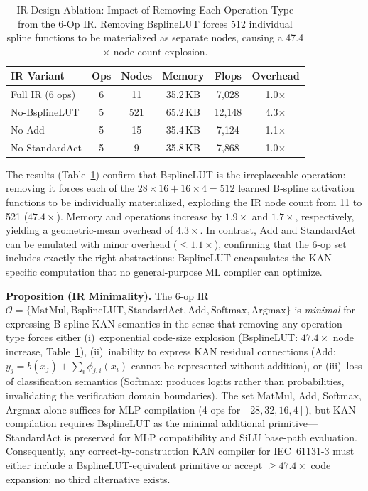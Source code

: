 \documentclass[journal,onecolumn]{IEEEtran}
\begin{document}
\begin{table}[t]
\centering
\caption{IR Design Ablation: Impact of Removing Each Operation Type from the 6-Op IR. Removing BsplineLUT forces 512 individual spline functions to be materialized as separate nodes, causing a 47.4$\times$ node-count explosion.}
\label{tab:ir_ablation}
\small
\footnotesize
\begin{tabular}{lccccc}
\toprule
\textbf{IR Variant} & \textbf{Ops} & \textbf{Nodes} &
  \textbf{Memory} & \textbf{Flops} & \textbf{Overhead} \\
\midrule
Full IR (6 ops)      & 6 & 11   & 35.2\,KB & 7{,}028  & 1.0$\times$ \\
No-BsplineLUT        & 5 & 521  & 65.2\,KB & 12{,}148 & 4.3$\times$ \\
No-Add               & 5 & 15   & 35.4\,KB & 7{,}124  & 1.1$\times$ \\
No-StandardAct       & 5 & 9    & 35.8\,KB & 7{,}868  & 1.0$\times$ \\
\bottomrule
\end{tabular}
\end{table}

The results (Table~\ref{tab:ir_ablation}) confirm that BsplineLUT is the
irreplaceable operation: removing it forces each of the $28\times16 +
16\times4 = 512$ learned B-spline activation functions to be
individually materialized, exploding the IR node count from 11 to 521
($47.4\times$). Memory and operations increase by $1.9\times$ and
$1.7\times$, respectively, yielding a geometric-mean overhead of
$4.3\times$. In contrast, Add and StandardAct can be emulated with
minor overhead ($\leq 1.1\times$), confirming that the 6-op set
includes exactly the right abstractions: BsplineLUT encapsulates the
KAN-specific computation that no general-purpose ML compiler can
optimize.

\vspace{4pt}
\noindent\textbf{Proposition (IR Minimality).}
The 6-op IR $\mathcal{O} = \{\text{MatMul}, \text{BsplineLUT},
\text{StandardAct}, \text{Add}, \text{Softmax}, \text{Argmax}\}$ is
\emph{minimal} for expressing B-spline KAN semantics in the sense that
removing any operation type forces either (i)~exponential code-size
explosion (BsplineLUT: $47.4\times$ node increase, Table~\ref{tab:ir_ablation}),
(ii)~inability to express KAN residual connections (Add: $y_j = b(x_j) +
\sum_i \phi_{j,i}(x_i)$ cannot be represented without addition), or
(iii)~loss of classification semantics (Softmax: produces logits rather
than probabilities, invalidating the verification domain boundaries).
The set {MatMul, Add, Softmax, Argmax} alone suffices for MLP
compilation (4 ops for $[28,32,16,4]$), but KAN compilation requires
BsplineLUT as the minimal additional primitive---StandardAct is
preserved for MLP compatibility and SiLU base-path evaluation.
Consequently, any correct-by-construction KAN compiler for IEC~61131-3
must either include a BsplineLUT-equivalent primitive or accept
$\geq 47.4\times$ code expansion; no third alternative exists.
\end{document}
